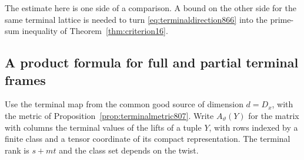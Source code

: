 \documentclass[a4paper,11pt]{article}
\theoremstyle{definition}
\theoremstyle{remark}
\numberwithin{equation}{section}
\begin{document}
The estimate here is one side of a comparison. A bound on the
other side for the same terminal lattice is needed to turn
\eqref{eq:terminaldirection866} into the prime-sum inequality
of Theorem~\ref{thm:criterion16}.
\clearpage

\subsection{A product formula for full and partial terminal frames}
\label{sec:longframe867}
Use the terminal map from the common good source of dimension
\(d=D_x\), with the metric of Proposition~\ref{prop:terminalmetric807}.
Write \(A_\vartheta(Y)\) for the matrix with columns the terminal
values of the lifts of a tuple \(Y\), with rows indexed by a finite
class and a tensor coordinate of its compact representation.
The terminal rank is \(s+mt\) and the class set depends on the twist.
\end{document}
